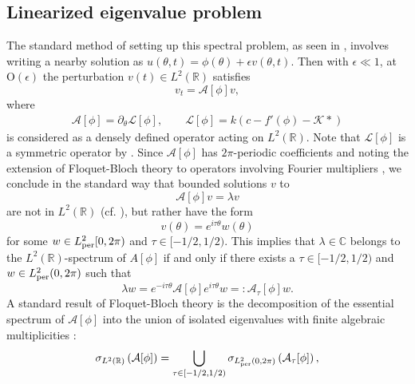 \documentclass[11pt,leqno]{article}
\numberwithin{equation}{section}
\renewcommand\d{\partial}
\newcommand{\R}{\mathbb R}
\newcommand{\RM}{{\mathbb{R}}}
\newcommand{\CM}{{\mathbb{C}}}
\theoremstyle{definition}
\begin{document}
\subsection{Linearized eigenvalue problem}
The standard method of setting up this spectral problem, as seen in \cite{BNR14,BrHJ16,JP2020}, involves writing a nearby solution as $u(\theta,t) = \phi(\theta) + \epsilon v(\theta,t)$. Then with $ \epsilon \ll 1 $, at O$ (\epsilon) $ the perturbation $v(t)\in L^2(\R)$ satisfies
\[
v_t = \mathcal{A}[\phi]v,
\]
where
\begin{align}
	\mathcal{A}[\phi] = \d_\theta\mathcal{L}[\phi], \qquad \mathcal{L}[\phi] = k\left(c - f'(\phi) - \mathcal{K}*\right) \label{eq:linearoperators}
\end{align}
is considered as a densely defined operator acting on $L^2(\R)$. Note that $\mathcal{L}[\phi]$ is a symmetric operator by . Since $ \mathcal{A}[\phi] $ has $2\pi$-periodic coefficients and noting the extension of Floquet-Bloch theory to operators involving Fourier multipliers \cite[Proposition 3.1]{J13}, we conclude in the standard way that bounded solutions $ v $ to
\begin{equation}\label{eq:spectralproblem}
\mathcal{A}[\phi]v=\lambda v
\end{equation}
 are not in $ L^{2}(\R) $ (cf. \cite{KP_book,RS4}), but rather have the form
\begin{equation}\label{e:quasiper}
    v(\theta)=e^{i\tau \theta}w(\theta)
\end{equation}
for some $w\in L^2_{\rm per}[0,2\pi)$ and $\tau\in[-1/2,1/2)$.  This implies that $\lambda\in \CM$ belongs to the $L^2(\RM)$-spectrum of $A[\phi]$ if and only if there exists a $\tau\in[-1/2,1/2)$ and $w\in L^2_{\rm per}(0,2\pi)$ such that
\begin{equation}\label{bloch_spec}
\lambda w = e^{-i\tau \theta}\mathcal{A}[\phi]e^{i\tau \theta}w=:\mathcal{A}_\tau[\phi]w.
\end{equation}
A standard result of Floquet-Bloch theory is the decomposition of the essential spectrum of $ \mathcal{A}[\phi] $ into the union of isolated eigenvalues with finite algebraic multiplicities \cite{RS4}:
\begin{equation}\label{spec_decomp}
\sigma_{L^2(\RM)}\left(\mathcal{A}[\phi]\right)=\bigcup_{\tau\in[-1/2,1/2)}\sigma_{L^2_{\rm per}(0,2\pi)}\left(\mathcal{A}_\tau[\phi]\right),
\end{equation}
\end{document}
